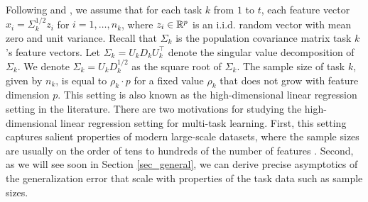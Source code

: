 Following \citet{HMRT19} and \citet{BLLT20},
we assume that for each task $k$ from $1$ to $t$, each feature vector $x_i = \Sigma^{1/2}_k z_i$ for $i = 1, \dots, n_k$, where $z_i\in\mathbb{R}^p$ is an i.i.d. random vector with  mean zero and unit variance.
Recall that $\Sigma_k$ is the population covariance matrix task $k$'s feature vectors.
Let $\Sigma_k = U_k D_k U_k^{\top}$ denote the singular value decomposition of $\Sigma_k$.
We denote $\Sigma_k = U_k D_k^{1/2}$ as the square root of $\Sigma_k$.
The sample size of task $k$, given by $n_k$, is equal to $\rho_k\cdot p$ for a fixed value $\rho_k$ that does not grow with feature dimension $p$.
This setting is also known as the high-dimensional linear regression setting in the literature.
There are two motivations for studying the high-dimensional linear regression setting for multi-task learning.
First, this setting captures salient properties of modern large-scale datasets, where the sample sizes are usually on the order of tens to hundreds of the number of features \cite{sur2019modern}.
Second, as we will see soon in Section \ref{sec_general}, we can derive precise asymptotics of the generalization error that scale with properties of the task data such as sample sizes.


